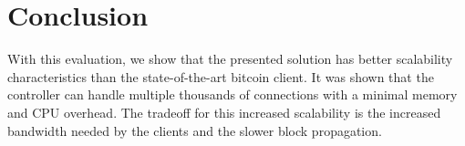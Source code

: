 \section{Conclusion}
With this evaluation, we show that the presented solution has better scalability characteristics than the state-of-the-art bitcoin client. It was shown that the controller can handle multiple thousands of connections with a minimal memory and CPU overhead. The tradeoff for this increased scalability is the increased bandwidth needed by the clients and the slower block propagation.




















